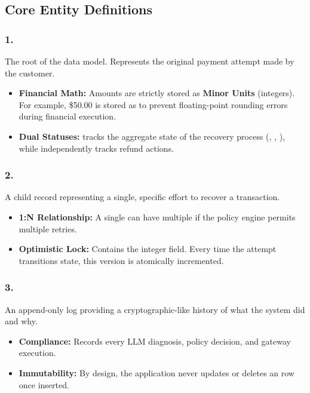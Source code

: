 \vspace{0.8cm}

\subsection{Core Entity Definitions}

\subsubsection{1. }
The root of the data model. Represents the original payment attempt made by the customer.
\begin{itemize}
    \item \textbf{Financial Math:} Amounts are strictly stored as \textbf{Minor Units} (integers). For example, \$50.00 is stored as  to prevent floating-point rounding errors during financial execution.
    \item \textbf{Dual Statuses:}  tracks the aggregate state of the recovery process (, , ), while  independently tracks refund actions.
\end{itemize}

\vspace{0.4cm}

\subsubsection{2. }
A child record representing a single, specific effort to recover a transaction.
\begin{itemize}
    \item \textbf{1:N Relationship:} A single  can have multiple  if the policy engine permits multiple retries.
    \item \textbf{Optimistic Lock:} Contains the  integer field. Every time the attempt transitions state, this version is atomically incremented.
\end{itemize}

\vspace{0.4cm}

\subsubsection{3. }
An append-only log providing a cryptographic-like history of what the system did and why.
\begin{itemize}
    \item \textbf{Compliance:} Records every LLM diagnosis, policy decision, and gateway execution.
    \item \textbf{Immutability:} By design, the application never updates or deletes an  row once inserted.
\end{itemize}

